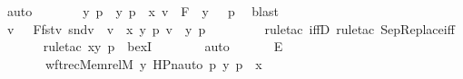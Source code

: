 \begin{isabellebody}
\ auto\isanewline
\ \ \ \ \isamarkupfalse%
\ \isamarkupfalse%
\ y\ p\ \ {\isachardoublequoteopen}{\isacharless}{\kern0pt}y{\isacharcomma}{\kern0pt}\ p{\isachargreater}{\kern0pt}\ {\isasymin}\ x{\isachardoublequoteclose}\ {\isachardoublequoteopen}v\ {\isacharequal}{\kern0pt}\ {\isasymlangle}F\ {\isacharbackquote}{\kern0pt}\ y{\isacharcomma}{\kern0pt}\ {\isasympi}\ {\isacharbackquote}{\kern0pt}\ p{\isasymrangle}{\isachardoublequoteclose}\ \isamarkupfalse%
\ blast\isanewline
\ \ \ \ \isamarkupfalse%
\ \isamarkupfalse%
\ {\isachardoublequoteopen}v\ {\isasymin}\ {\isacharbraceleft}{\kern0pt}\ {\isacharless}{\kern0pt}F{\isacharbackquote}{\kern0pt}fst{\isacharparenleft}{\kern0pt}v{\isacharparenright}{\kern0pt}{\isacharcomma}{\kern0pt}\ {\isasympi}{\isacharbackquote}{\kern0pt}snd{\isacharparenleft}{\kern0pt}v{\isacharparenright}{\kern0pt}{\isachargreater}{\kern0pt}\ {\isachardot}{\kern0pt}{\isachardot}{\kern0pt}\ v\ {\isasymin}\ x{\isacharcomma}{\kern0pt}\ {\isasymexists}y\ p{\isachardot}{\kern0pt}\ v\ {\isacharequal}{\kern0pt}\ {\isacharless}{\kern0pt}y{\isacharcomma}{\kern0pt}\ p{\isachargreater}{\kern0pt}\ {\isacharbraceright}{\kern0pt}{\isachardoublequoteclose}\ \isanewline
\ \ \ \ \ \ \isamarkupfalse%
{\isacharparenleft}{\kern0pt}rule{\isacharunderscore}{\kern0pt}tac\ iffD{}{\isacharcomma}{\kern0pt}\ rule{\isacharunderscore}{\kern0pt}tac\ SepReplace{\isacharunderscore}{\kern0pt}iff{\isacharparenright}{\kern0pt}\isanewline
\ \ \ \ \ \ \isamarkupfalse%
{\isacharparenleft}{\kern0pt}rule{\isacharunderscore}{\kern0pt}tac\ x{\isacharequal}{\kern0pt}{\isachardoublequoteopen}{\isacharless}{\kern0pt}y{\isacharcomma}{\kern0pt}\ p{\isachargreater}{\kern0pt}{\isachardoublequoteclose}\ \ bexI{\isacharparenright}{\kern0pt}\isanewline
\ \ \ \ \ \ \isamarkupfalse%
\ auto\isanewline
\ \ \isamarkupfalse%
\isanewline
\ \ \isamarkupfalse%
\ E{}{\isacharcolon}{\kern0pt}\isanewline
\ \ \ \ {\isachardoublequoteopen}{\isachardot}{\kern0pt}{\isachardot}{\kern0pt}{\isachardot}{\kern0pt}\ {\isacharequal}{\kern0pt}\ {\isacharbraceleft}{\kern0pt}\ {\isacharless}{\kern0pt}wftrec{\isacharparenleft}{\kern0pt}Memrel{\isacharparenleft}{\kern0pt}M{\isacharparenright}{\kern0pt}{\isacharcircum}{\kern0pt}{\isacharplus}{\kern0pt}{\isacharcomma}{\kern0pt}\ y{\isacharcomma}{\kern0pt}\ HPn{\isacharunderscore}{\kern0pt}auto{\isacharparenleft}{\kern0pt}{\isasympi}{\isacharparenright}{\kern0pt}{\isacharparenright}{\kern0pt}{\isacharcomma}{\kern0pt}\ {\isasympi}{\isacharbackquote}{\kern0pt}p{\isachargreater}{\kern0pt}{\isachardot}{\kern0pt}\ {\isacharless}{\kern0pt}y{\isacharcomma}{\kern0pt}\ p{\isachargreater}{\kern0pt}\ {\isasymin}\ x\ {\isacharbraceright}{\kern0pt}{\isachardoublequoteclose}\isanewline

\end{isabellebody}
